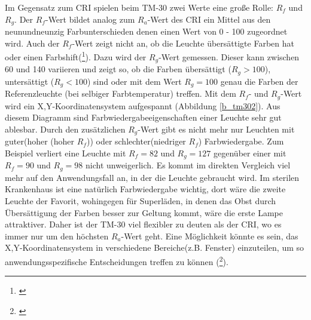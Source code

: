 Im Gegensatz zum CRI spielen beim TM-30 zwei Werte eine große Rolle: $R_{f}$ und $R_{g}$. Der $R_{f}$-Wert bildet analog zum $R_{a}$-Wert des CRI ein Mittel aus den neunundneunzig Farbunterschieden denen einen Wert von 0 - 100 zugeordnet wird. Auch der $R_{f}$-Wert zeigt nicht an, ob die Leuchte übersättigte Farben hat oder einen Farbshift(\footnote{\cite[10]{royerhouser}}). Dazu wird der $R_{g}$-Wert gemessen. Dieser kann zwischen 60 und 140 variieren und zeigt so, ob die Farben übersättigt ($R_{g} > 100$), untersättigt ($R_{g} < 100$) sind oder mit dem Wert $R_{g} = 100$ genau die Farben der Referenzleuchte (bei selbiger Farbtemperatur) treffen. Mit dem $R_{f}$- und $R_{g}$-Wert wird ein X,Y-Koordinatensystem aufgespannt (Abbildung \ref{b_tm302}). Aus diesem Diagramm sind Farbwiedergabeeigenschaften einer Leuchte sehr gut ablesbar. Durch den zusätzlichen $R_{g}$-Wert gibt es nicht mehr nur Leuchten mit \glqq guter\grqq (hoher (hoher $R_{f}$)) oder \glqq schlechter\grqq (niedriger $R_{f}$) Farbwiedergabe. Zum Beispiel verliert eine Leuchte mit $R_{f}=82$ und $R_{g}=127$ gegenüber einer mit $R_{f}=90$ und $R_{g}=98$ nicht unweigerlich. Es kommt im direkten Vergleich viel mehr auf den Anwendungsfall an, in der die Leuchte gebraucht wird. Im sterilen Krankenhaus ist eine natürlich Farbwiedergabe wichtig, dort wäre die zweite Leuchte der Favorit, wohingegen für Superläden, in denen das Obst durch Übersättigung der Farben besser zur Geltung kommt, wäre die erste Lampe attraktiver. 
Daher ist der TM-30 viel flexibler zu deuten als der CRI, wo es immer nur um den höchsten $R_{a}$-Wert geht. Eine Möglichkeit könnte es sein, das X,Y-Koordinatensystem in verschiedene Bereiche(z.B. Fenster) einzuteilen, um so anwendungsspezifische Entscheidungen treffen zu können (\footnote{\cite[4]{royer}}).  


